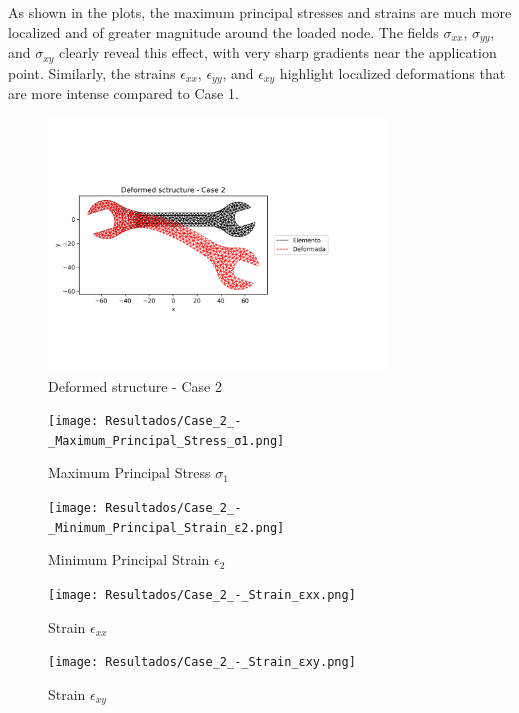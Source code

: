 \documentclass[12pt]{article}
\begin{document}
As shown in the plots, the maximum principal stresses and strains are much more localized and of greater magnitude around the loaded node.  
The fields $\sigma_{xx}$, $\sigma_{yy}$, and $\sigma_{xy}$ clearly reveal this effect, with very sharp gradients near the application point.  
Similarly, the strains $\epsilon_{xx}$, $\epsilon_{yy}$, and $\epsilon_{xy}$ highlight localized deformations that are more intense compared to Case 1.

\begin{figure}[H]
    \centering
    \includegraphics[width=0.8\textwidth]{Resultados/Deformed_sctructure_-_Case_2.png}
    \caption{Deformed structure - Case 2}
    \label{fig:fig12}
\end{figure}

\begin{figure}[H]
    \centering
    \begin{minipage}{0.48\textwidth}
        \centering
        \texttt{[image: Resultados/Case\_2\_-\_Maximum\_Principal\_Stress\_σ1.png]}
        \caption{Maximum Principal Stress $\sigma_1$}
        \label{fig:fig13}
    \end{minipage}
    \hfill
    \begin{minipage}{0.48\textwidth}
        \centering
        \texttt{[image: Resultados/Case\_2\_-\_Minimum\_Principal\_Strain\_ε2.png]}
        \caption{Minimum Principal Strain $\epsilon_2$}
        \label{fig:fig14}
    \end{minipage}
\end{figure}

\begin{figure}[H]
    \centering
    \begin{minipage}{0.48\textwidth}
        \centering
        \texttt{[image: Resultados/Case\_2\_-\_Strain\_εxx.png]}
        \caption{Strain $\epsilon_{xx}$}
        \label{fig:fig15}
    \end{minipage}
    \hfill
    \begin{minipage}{0.48\textwidth}
        \centering
        \texttt{[image: Resultados/Case\_2\_-\_Strain\_εxy.png]}
        \caption{Strain $\epsilon_{xy}$}
        \label{fig:fig16}
    \end{minipage}
\end{figure}
\end{document}
